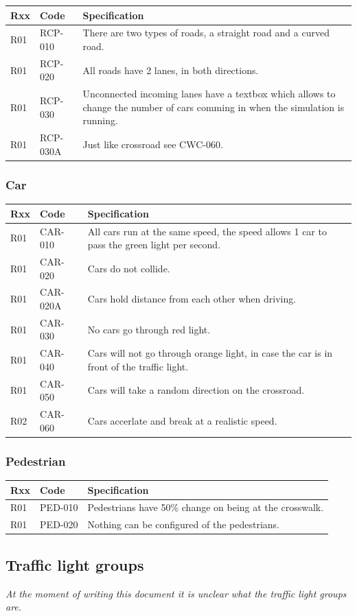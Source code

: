 \begin{tabularx}{\textwidth}{|p{0.5cm}p{2cm}X|}\hline
	Rxx & Code & Specification \\\hline
	R01 & RCP-010 & There are two types of roads, a straight road and a curved road.\\\hline
	R01 & RCP-020 & All roads have 2 lanes, in both directions.\\\hline
	R01 & RCP-030 & Unconnected incoming lanes have a textbox which allows to change the number of cars comming in when the simulation is running.\\\hline
	R01 & RCP-030A & Just like crossroad see CWC-060.\\\hline
\end{tabularx}

\subsubsection{Car}
\begin{tabularx}{\textwidth}{|p{0.5cm}p{2cm}X|}\hline
	Rxx & Code & Specification \\\hline
	R01 & CAR-010 & All cars run at the same speed, the speed allows 1 car to pass the green light per second.\\\hline
	R01 & CAR-020 & Cars do not collide.\\\hline
	R01 & CAR-020A & Cars hold distance from each other when driving.\\\hline
	R01 & CAR-030 & No cars go through red light.\\\hline
	R01 & CAR-040 & Cars will not go through orange light, in case the car is in front of the traffic light.\\\hline
	R01 & CAR-050 & Cars will take a random direction on the crossroad.\\\hline
	R02 & CAR-060 & Cars accerlate and break at a realistic speed.\\\hline
\end{tabularx}

\subsubsection{Pedestrian}
\begin{tabularx}{\textwidth}{|p{0.5cm}p{2cm}X|}\hline
	Rxx & Code & Specification \\\hline
	R01 & PED-010 & Pedestrians have 50\% change on being at the crosswalk.\\\hline
	R01 & PED-020 & Nothing can be configured of the pedestrians.\\\hline
\end{tabularx}

\subsection{Traffic light groups}
\textsl{At the moment of writing this document it is unclear what the traffic light groups are.}

